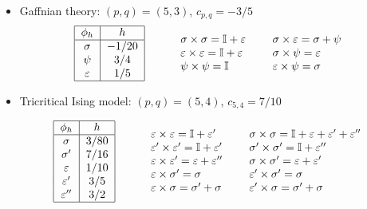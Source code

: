 \documentclass[a4paper,11pt]{article}
\begin{document}
\begin{itemize}
\item Gaffnian theory: $(p, q)=(5, 3)$, $c_{p, q}=-3/5$
\begin{equation}
  \begin{tabular}{cc}
 \begin{tabular}{|c|c|}
  \hline
  $\phi_h$        & $h$ \\
  \hline
  $\sigma$  & $-1/20$    \\
  $\psi$     & $3/4$      \\
  $\varepsilon$ & $1/5$  \\
  \hline
 \end{tabular}
 &
 \hskip 0.5cm 
 \begin{tabular}{lcl}
  $\sigma \times \sigma = \mathbb{I} +\varepsilon$ & & $\sigma \times \varepsilon = \sigma +\psi$ \\
  $\varepsilon\times \varepsilon = \mathbb{I} + \varepsilon$ & & $\sigma \times \psi = \varepsilon$\\
  $\psi \times \psi = \mathbb{I}$ & &  $\varepsilon \times \psi = \sigma$\\
 \end{tabular}
 \end{tabular}
\end{equation}

\item Tricritical Ising model: $(p, q)=(5, 4)$, $c_{5, 4}=7/10$

\begin{equation}\label{tric_ising_fields}
  \begin{tabular}{cc}
 \begin{tabular}{|c|c|}
  \hline
  $\phi_h$        & $h$ \\
  \hline
  $\sigma$  & $3/80$    \\
  $\sigma'$     & $7/16$      \\
  $\varepsilon$ & $1/10$  \\
  $\varepsilon'$ &  $3/5$     \\
  $\varepsilon''$ & $3/2$     \\
  \hline
 \end{tabular}
 &
 \hskip 0.5cm 
 \begin{tabular}{lcl}
  $\varepsilon \times \varepsilon = \mathbb{I} +\varepsilon'$ & & $\sigma \times \sigma = \mathbb{I} +\varepsilon+\varepsilon'+\varepsilon''$ \\
  $\varepsilon'\times \varepsilon' = \mathbb{I} + \varepsilon'$ & & $\sigma' \times \sigma' = \mathbb{I}+\varepsilon''$\\
  $\varepsilon \times \varepsilon' = \varepsilon+\varepsilon''$ & &  $\sigma \times \sigma' = \varepsilon+\varepsilon'$\\
  $\varepsilon \times \sigma' = \sigma$                         & &  $\varepsilon'\times \sigma'= \sigma$ \\
  $\varepsilon \times \sigma = \sigma'+\sigma$                  & &  $\varepsilon'\times \sigma = \sigma'+\sigma$ \\
 \end{tabular}
 \end{tabular}
\end{equation}

\end{itemize}
\end{document}
